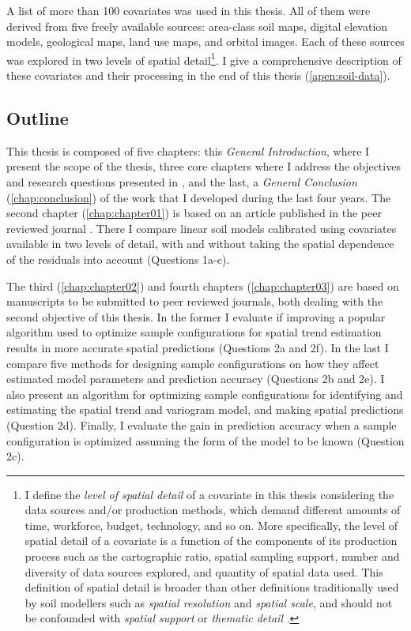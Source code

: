 A list of more than \num{100} covariates was used in this thesis. All of them were derived from five freely 
available sources: area-class soil maps, digital elevation models, geological maps, land use maps, and orbital 
images. Each of these sources was explored in two levels of spatial detail\footnote{I define the \emph{level of 
spatial detail} of a covariate in this thesis considering the data sources and/or production methods, which 
demand different amounts of time, workforce, budget, technology, and so on. More specifically, the level of 
spatial detail of a covariate is a function of the components of its production process such as the 
cartographic ratio, spatial sampling support, number and diversity of data sources explored, and quantity of 
spatial data used. This definition of spatial detail is broader than other definitions traditionally used by 
soil modellers such as \emph{spatial resolution} and \emph{spatial scale}, and should not be confounded with 
\emph{spatial support} \cite{WebsterEtAl2007} or \emph{thematic detail} \cite{Rossiter2000}.}. I give a 
comprehensive description of these covariates and their processing in the end of this thesis 
(\autoref{apen:soil-data}).

\subsection{Outline}
\label{sec:thesis-outline}

This thesis is composed of five chapters: this \emph{General Introduction}, where I present the scope
of the thesis, three core chapters where I address the objectives and research questions presented
in , and the last, a \emph{General Conclusion} (\autoref{chap:conclusion})
of the work that I developed during the last four years. The second chapter (\autoref{chap:chapter01})
is based on an article published in the peer reviewed journal \geoderma. There I compare linear
soil models calibrated using covariates available in two levels of detail, with and without
taking the spatial dependence of the residuals into account (Questions 1a-c).

The third (\autoref{chap:chapter02}) and fourth chapters (\autoref{chap:chapter03}) are based on
manuscripts to be submitted to peer reviewed journals, both dealing with the second objective of this
thesis. In the former I evaluate if improving a popular algorithm used to optimize sample configurations
for spatial trend estimation results in more accurate spatial predictions (Questions 2a and 2f). In the
last I compare five methods for designing sample configurations on how they affect estimated model
parameters and prediction accuracy (Questions 2b and 2e). I also present an algorithm for optimizing
sample configurations for identifying and estimating the spatial trend and variogram model, and making
spatial predictions (Question 2d). Finally, I evaluate the gain in prediction accuracy when a sample
configuration is optimized assuming the form of the model to be known (Question 2c).

